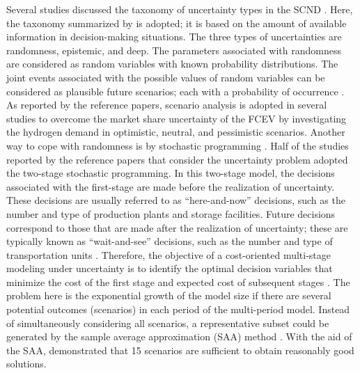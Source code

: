 \documentclass[11pt,3p]{elsarticle}
\begin{document}
Several studies discussed the taxonomy of uncertainty types in the SCND \citep{klibi2010design,bairamzadeh2018modelling,govindan2017supply}. Here, the taxonomy summarized by \citet{bairamzadeh2018modelling} is adopted; it is based on the amount of available information in decision-making situations. The three types of uncertainties are randomness, epistemic, and deep. The parameters associated with randomness are considered as random variables with known probability distributions. The joint events associated with the possible values of random variables can be considered as plausible future scenarios; each with a probability of occurrence \citep{klibi2010design}. As reported by the reference papers, scenario analysis is adopted in several studies to overcome the market share uncertainty of the FCEV by investigating the hydrogen demand in optimistic, neutral, and pessimistic scenarios. Another way to cope with randomness is by stochastic programming \citep{eppen1989or,sen1999introductory}. Half of the studies reported by the reference papers that consider the uncertainty problem adopted the two-stage stochastic programming. In this two-stage model, the decisions associated with the first-stage are made before the realization of uncertainty. These decisions are usually referred to as ``here-and-now'' decisions, such as the number and type of production plants and storage facilities. Future decisions correspond to those that are made after the realization of uncertainty; these are typically known as ``wait-and-see'' decisions, such as the number and type of transportation units \citep{almansoori2012design,kim2008strategic}. Therefore, the objective of a cost-oriented multi-stage modeling under uncertainty is to identify the optimal decision variables that minimize the cost of the first stage and expected cost of subsequent stages \citep{almansoori2012design}. The problem here is the exponential growth of the model size if there are several potential outcomes (scenarios) in each period of the multi-period model. Instead of simultaneously considering all scenarios, a representative subset could be generated by the sample average approximation (SAA) method \citep{santoso2005stochastic}. With the aid of the SAA, \citet{dayhim2014planning} demonstrated that 15 scenarios are sufficient to obtain reasonably good solutions.
\end{document}
